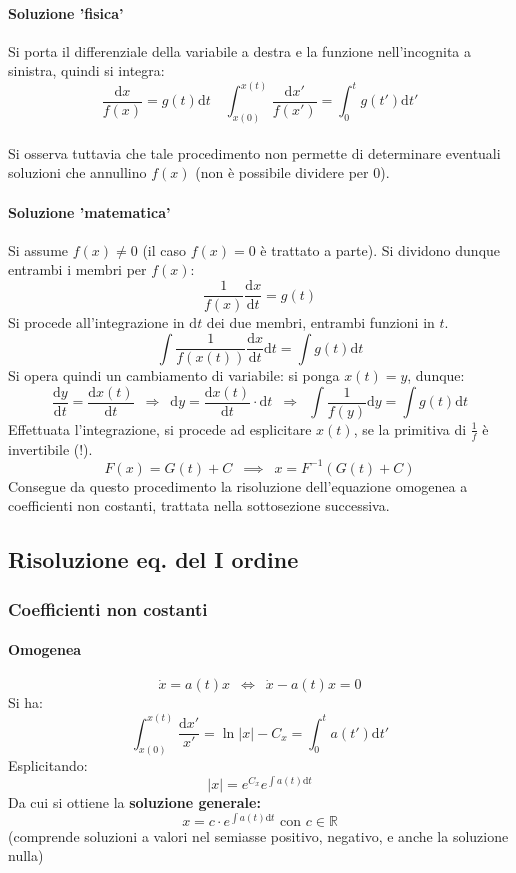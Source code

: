 \documentclass[10pt]{article}
\theoremstyle{plain}
\begin{document}
\paragraph*{Soluzione 'fisica'}
Si porta il differenziale della variabile a destra e la funzione nell'incognita a sinistra, quindi si integra:
\[\frac{\textrm{d}x}{f(x)} = g(t) \textrm{d}t \quad \int_{x(0)}^{x(t)}\frac{\textrm{d}x'}{f(x')} = \int_0^t g(t') \textrm{d}t'\]
\\Si osserva tuttavia che tale procedimento non permette di determinare eventuali soluzioni che annullino $f(x)$ (non è possibile dividere per $0$).

\paragraph*{Soluzione 'matematica'}
Si assume $f(x) \neq 0$ (il caso $f(x) = 0$ è trattato a parte). Si dividono dunque entrambi i membri per $f(x)$:
\[\frac{1}{f(x)}\frac{\textrm{d}x}{\textrm{d}t} = g(t)\]
Si procede all'integrazione in $\textrm{d}t$ dei due membri, entrambi funzioni in $t$.
\[\int \frac{1}{f(x(t))}\frac{\textrm{d}x}{\textrm{d}t} \textrm{d}t = \int g(t) \textrm{d}t\]
Si opera quindi un cambiamento di variabile: si ponga $x(t) = y$, dunque:
\[\frac{\textrm{d}y}{\textrm{d}t} = \frac{\textrm{d}x(t)}{\textrm{d}t} \enspace \Rightarrow \enspace \textrm{d}y = \frac{\textrm{d}x(t)}{\textrm{d}t} \cdot \textrm{d}t \enspace \Rightarrow \enspace \int \frac{1}{f(y)}\textrm{d}y  = \int g(t) \textrm{d}t\]
Effettuata l'integrazione, si procede ad esplicitare $x(t)$, se la primitiva di $\frac{1}{f}$ è invertibile (!).
\[F(x) = G(t) + C \enspace \implies \enspace x = F^{-1}(G(t) + C)\]
Consegue da questo procedimento la risoluzione dell'equazione omogenea a coefficienti non costanti, trattata nella sottosezione successiva.

\subsection{Risoluzione eq. del I ordine}
\subsubsection{Coefficienti non costanti}
\paragraph*{Omogenea}
\[\dot x = a(t) x \enspace \Leftrightarrow \enspace \dot x - a(t) x = 0\]
Si ha:
\[\int_{x(0)}^{x(t)} \frac{\textrm{d}x'}{x'} = \ln|x| - C_x = \int_0^t a(t') \textrm{d}t'\]
Esplicitando:
\[|x| = e^{C_x}e^{\int a(t) \textrm{d}t}\]
Da cui si ottiene la \textbf{soluzione generale:}
\[\boxed{x = c \cdot e^{\int a(t) \textrm{d}t}} \textrm{ con } c \in \mathbb{R}\]
(comprende soluzioni a valori nel semiasse positivo, negativo, e anche la soluzione nulla)
\end{document}

